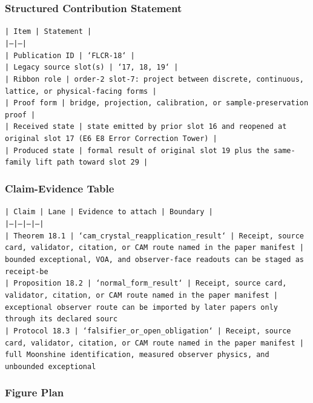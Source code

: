 \documentclass[11pt]{article}
\begin{document}
\subsubsection*{Structured Contribution Statement}

\noindent\texttt{| Item | Statement |}\\
\noindent\texttt{|---|---|}\\
\noindent\texttt{| Publication ID | `FLCR-18` |}\\
\noindent\texttt{| Legacy source slot(s) | `17, 18, 19` |}\\
\noindent\texttt{| Ribbon role | order-2 slot-7: project between discrete, continuous, lattice, or physical-facing forms |}\\
\noindent\texttt{| Proof form | bridge, projection, calibration, or sample-preservation proof |}\\
\noindent\texttt{| Received state | state emitted by prior slot 16 and reopened at original slot 17 (E6 E8 Error Correction Tower) |}\\
\noindent\texttt{| Produced state | formal result of original slot 19 plus the same-family lift path toward slot 29 |}\\

\subsubsection*{Claim-Evidence Table}

\noindent\texttt{| Claim | Lane | Evidence to attach | Boundary |}\\
\noindent\texttt{|---|---|---|---|}\\
\noindent\texttt{| Theorem 18.1 | `cam\_crystal\_reapplication\_result` | Receipt, source card, validator, citation, or CAM route named in the paper manifest | bounded exceptional, VOA, and observer-face readouts can be staged as receipt-be}\\
\noindent\texttt{| Proposition 18.2 | `normal\_form\_result` | Receipt, source card, validator, citation, or CAM route named in the paper manifest | exceptional observer route can be imported by later papers only through its declared sourc}\\
\noindent\texttt{| Protocol 18.3 | `falsifier\_or\_open\_obligation` | Receipt, source card, validator, citation, or CAM route named in the paper manifest | full Moonshine identification, measured observer physics, and unbounded exceptional}\\

\subsubsection*{Figure Plan}
\end{document}
